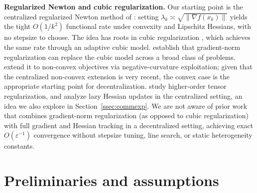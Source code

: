 \documentclass[11pt,a4paper]{article}
\def\cO{O}%
\newcommand{\cO}{\mathcal{O}}
\begin{document}
	\noindent\textbf{Regularized Newton and cubic regularization.}
	Our starting point is the centralized regularized Newton method of
	\citet{mishchenko2023rn}: setting
	$\lambda_k\asymp\sqrt{\|\nabla f(x_k)\|}$ yields the tight
	$\cO(1/k^2)$ functional rate under convexity and Lipschitz Hessians,
	with no stepsize to choose.
	The idea has roots in cubic regularization
	\citep{nesterov2006cubic,cartis2011arc}, which achieves the same rate
	through an adaptive cubic model.
	\citet{doikov2024gradient} establish that gradient-norm
	regularization can replace the cubic model across a broad class of
	problems.
	\citet{ding2025nonconvex} extend it to non-convex objectives via
	negative-curvature exploitation; given that the centralized
	non-convex extension is very recent, the convex case is the
	appropriate starting point for decentralization.
	\citet{doikov2021optimization} study higher-order tensor
	regularization, and \citet{hanzely2022newton} analyze lazy Hessian
	updates in the centralized setting, an idea we also explore in
	Section~\ref{ssec:commexp}.
	We are not aware of prior work that combines gradient-norm
	regularization (as opposed to cubic regularization) with full
	gradient and Hessian tracking in a decentralized setting,
	achieving exact $\cO(\varepsilon^{-1})$ convergence without
	stepsize tuning, line search, or static heterogeneity constants.
	
	\section{Preliminaries and assumptions}\label{sec:prelim}
\end{document}
